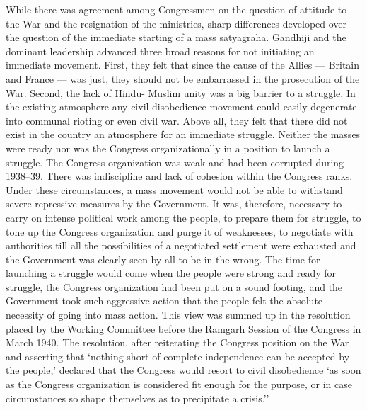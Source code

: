 While there was agreement among Congressmen on the question of attitude to the War and the resignation of the ministries, sharp differences developed over the question of the immediate starting of a mass satyagraha. Gandhiji and the dominant leadership advanced three broad reasons for not initiating an immediate movement. First, they felt that since the cause of the Allies --- Britain and France --- was just, they should not be embarrassed in the prosecution of the War. Second, the lack of Hindu- Muslim unity was a big barrier to a struggle. In the existing atmosphere any civil disobedience movement could easily degenerate into communal rioting or even civil war. Above all, they felt that there did not exist in the country an atmosphere for an immediate struggle. Neither the masses were ready nor was the Congress organizationally in a position to launch a struggle. The Congress organization was weak and had been corrupted during 1938--39. There was indiscipline and lack of cohesion within the Congress ranks. Under these circumstances, a mass movement would not be able to withstand severe repressive measures by the Government. It was, therefore, necessary to carry on intense political work among the people, to prepare them for struggle, to tone up the Congress organization and purge it of weaknesses, to negotiate with authorities till all the possibilities of a negotiated settlement were exhausted and the Government was clearly seen by all to be in the wrong. The time for launching a struggle would come when the people were strong and ready for struggle, the Congress organization had been put on a sound footing, and the Government took such aggressive action that the people felt the absolute necessity of going into mass action. This view was summed up in the resolution placed by the Working Committee before the Ramgarh Session of the Congress in March 1940. The resolution, after reiterating the Congress position on the War and asserting that `nothing short of complete independence can be accepted by the people,' declared that the Congress would resort to civil disobedience `as soon as the Congress organization is considered fit enough for the purpose, or in case circumstances so shape themselves as to precipitate a crisis.'' 

